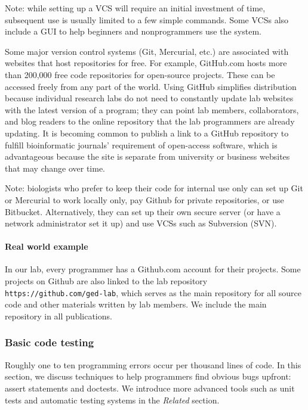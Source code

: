 \documentclass[ChapterTOCs,krantz2]{krantz} %
\begin{document}
Note: while setting up a VCS will require an initial investment of time, 
subsequent use is usually limited to a few simple commands.  Some VCSs
also include a GUI to help beginners and nonprogrammers use the system.

Some major version control systems (Git, Mercurial, etc.) are associated with websites 
that host repositories for free.  For example, GitHub.com hosts more than 200,000 free code
repositories for open-source projects. These can be accessed
freely from any part of the world.  Using GitHub
simplifies distribution because individual research labs do not need to
constantly update lab websites with the latest version of a program;
they can point lab members, collaborators, and blog readers to the online
repository that the lab programmers are already updating.  It is becoming 
common to publish a link to a GitHub repository to
fulfill bioinformatic journals' requirement of open-access software, 
which is advantageous because the site is separate from
university or business websites that may change over time.  

Note: biologists who prefer to keep their
code for internal use only can set up Git or Mercurial to work 
locally only, pay Github for private repositories, or use Bitbucket.  
Alternatively, they can set up their own secure
server (or have a network administrator set it up) and use
VCSs such as Subversion (SVN).

\paragraph{Real world example}

In our lab, every programmer has a Github.com account for their projects.
Some
projects on Github are also linked to the lab repository
\texttt{https://github.com/ged-lab}, which serves as the main repository for
all source code and other materials written by lab members. 
We include the main repository in all
publications. 

\subsubsection{Basic code testing}

Roughly one to ten programming errors occur 
per thousand lines of code\cite{Boehm2005,Ince2012}.  
In this section, we discuss techniques to help
programmers find obvious bugs upfront: 
assert statements and doctests. We introduce more advanced
tools such as unit tests and automatic testing systems in the \emph{Related}
section.
\end{document}
